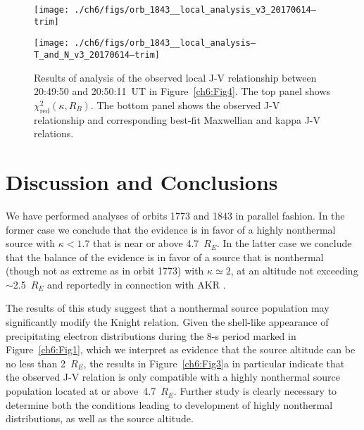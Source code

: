 
  \begin{figure}
    \centering

    \noindent\texttt{[image: ./ch6/figs/orb\_1843\_\_local\_analysis\_v3\_20170614--trim]}

    \vspace{1cm}

    \noindent\texttt{[image: ./ch6/figs/orb\_1843\_\_local\_analysis--T\_and\_N\_v3\_20170614--trim]}

    \caption[Orbit 1843: Reduced chi-squared values for local J-V relationship
    and corresponding best-fit curves.]{Results of analysis of the observed
      local J-V relationship between 20:49:50 and 20:50:11~UT in
      Figure~\ref{ch6:Fig4}. The top panel shows
      $\chi^2_{\mathrm{red}} ( \kappa, R_B)$. The bottom panel shows the
      observed J-V relationship and corresponding best-fit Maxwellian and kappa
      J-V relations.}
    \label{ch6:Fig8}
  \end{figure}



  \section{Discussion and Conclusions}

  We have performed analyses of orbits 1773 and 1843 in parallel fashion. In the
  former case we conclude that the evidence is in favor of a highly nonthermal
  source with $\kappa < 1.7$ that is near or above 4.7~$R_E$. In the latter case
  we conclude that the balance of the evidence is in favor of a source that is
  nonthermal (though not as extreme as in orbit 1773) with $\kappa \simeq 2$, at
  an altitude not exceeding $\sim$2.5~$R_E$ and reportedly in connection with
  AKR \citep{Ergun1998}.

  The results of this study suggest that a nonthermal source population may
  significantly modify the Knight relation. Given the shell-like appearance of
  precipitating electron distributions during the 8-s period marked in
  Figure~\ref{ch6:Fig1}, which we interpret as evidence that the source altitude
  can be no less than 2~$R_E$, the results in Figure~\ref{ch6:Fig3}a in
  particular indicate that the observed J-V relation is only compatible with a
  highly nonthermal source population located at or above~4.7~$R_E$. Further
  study is clearly necessary to determine both the conditions leading to
  development of highly nonthermal distributions, as well as the source
  altitude.

